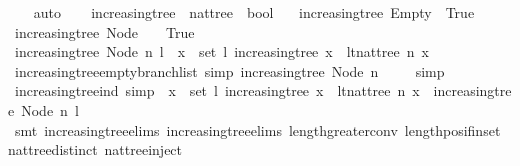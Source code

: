\begin{isabellebody}
%
\isadelimproof
\ \ %
\endisadelimproof
%
\isatagproof
{}\isamarkupfalse%
\ auto%
\endisatagproof
{\isafoldproof}%
%
\isadelimproof
\isanewline
%
\endisadelimproof
\ \ \isanewline
{}\isamarkupfalse%
\ increasing{\isacharunderscore}tree\ {\isacharcolon}{\isacharcolon}\ {\isachardoublequoteopen}nattree\ {\isasymRightarrow}\ bool{\isachardoublequoteclose}\ \isanewline
\ \ {\isachardoublequoteopen}increasing{\isacharunderscore}tree\ Empty\ {\isacharequal}\ True{\isachardoublequoteclose}\isanewline
{\isacharbar}\ {\isachardoublequoteopen}increasing{\isacharunderscore}tree\ {\isacharparenleft}Node\ {\isacharunderscore}\ {\isacharbrackleft}{\isacharbrackright}{\isacharparenright}\ {\isacharequal}\ True{\isachardoublequoteclose}\ \isanewline
{\isacharbar}\ {\isachardoublequoteopen}increasing{\isacharunderscore}tree\ {\isacharparenleft}Node\ n\ l{\isacharparenright}\ {\isacharequal}\ {\isacharparenleft}{\isasymforall}x\ {\isasymin}\ set\ l{\isachardot}\ increasing{\isacharunderscore}tree\ x\ {\isasymand}\ lt{\isacharunderscore}nat{\isacharunderscore}tree\ n\ x{\isacharparenright}{\isachardoublequoteclose}\isanewline
\isanewline
{}\isamarkupfalse%
\ increasing{\isacharunderscore}tree{\isacharunderscore}empty{\isacharunderscore}branch{\isacharunderscore}list\ {\isacharbrackleft}simp{\isacharbrackright}{\isacharcolon}\ {\isachardoublequoteopen}increasing{\isacharunderscore}tree\ {\isacharparenleft}Node\ n\ {\isacharbrackleft}{\isacharbrackright}{\isacharparenright}{\isachardoublequoteclose}\isanewline
%
\isadelimproof
\ \ %
\endisadelimproof
%
\isatagproof
{}\isamarkupfalse%
\ simp%
\endisatagproof
{\isafoldproof}%
%
\isadelimproof
\isanewline
%
\endisadelimproof
\isanewline
{}\isamarkupfalse%
\ increasing{\isacharunderscore}tree{\isacharunderscore}ind\ {\isacharbrackleft}simp{\isacharbrackright}\ {\isacharcolon}\ {\isachardoublequoteopen}{\isacharparenleft}{\isasymforall}x\ {\isasymin}\ set\ l{\isachardot}\ increasing{\isacharunderscore}tree\ x\ {\isasymand}\ lt{\isacharunderscore}nat{\isacharunderscore}tree\ n\ x{\isacharparenright}\ {\isasymlongleftrightarrow}\ increasing{\isacharunderscore}tree\ {\isacharparenleft}Node\ n\ l{\isacharparenright}{\isachardoublequoteclose}\isanewline
%
\isadelimproof
\ \ %
\endisadelimproof
%
\isatagproof
{}\isamarkupfalse%
\ {\isacharparenleft}smt\ increasing{\isacharunderscore}tree{\isachardot}elims{\isacharparenleft}{}{\isacharparenright}\ increasing{\isacharunderscore}tree{\isachardot}elims{\isacharparenleft}{}{\isacharparenright}\ length{\isacharunderscore}greater{\isacharunderscore}{}{\isacharunderscore}conv\ length{\isacharunderscore}pos{\isacharunderscore}if{\isacharunderscore}in{\isacharunderscore}set\ nattree{\isachardot}distinct{\isacharparenleft}{}{\isacharparenright}\ nattree{\isachardot}inject{\isacharparenright}%

\end{isabellebody}
